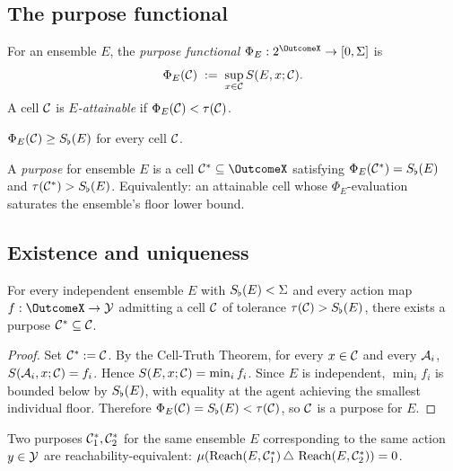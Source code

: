 \subsection{The purpose functional}

\begin{definition}\label{def:purp-func}
For an ensemble $E$, the \emph{purpose functional}
$\Phi_E:2^{\OutcomeX}\to[0,\Sigma]$ is
\[
\Phi_E(\mathcal{C})\;:=\;\sup_{x\in\mathcal{C}} S(E,x;\mathcal{C}).
\]
A cell $\mathcal{C}$ is \emph{$E$-attainable} if $\Phi_E(\mathcal{C})<\tau(\mathcal{C})$.
\end{definition}

\begin{proposition}\label{prop:phi-lb}
$\Phi_E(\mathcal{C})\ge S_{\flat}(E)$ for every cell $\mathcal{C}$.
\end{proposition}

\begin{definition}[Purpose]\label{def:purpose}
A \emph{purpose} for ensemble $E$ is a cell $\Cell^*\subseteq\OutcomeX$
satisfying $\Phi_E(\mathcal{C}^*)=S_{\flat}(E)$ and $\tau(\mathcal{C}^*)>S_{\flat}(E)$.
Equivalently: an attainable cell whose $\Phi_E$-evaluation saturates the
ensemble's floor lower bound.
\end{definition}

\subsection{Existence and uniqueness}

\begin{theorem}\label{thm:purp-exist}
For every independent ensemble $E$ with $S_{\flat}(E)<\Sigma$ and every
action map $\ActionMap:\OutcomeX\to\ActionSp$ admitting a cell $\mathcal{C}$ of
tolerance $\tau(\mathcal{C})>S_{\flat}(E)$, there exists a purpose
$\mathcal{C}^*\subseteq\mathcal{C}$.
\end{theorem}

\begin{proof}
Set $\mathcal{C}^*:=\mathcal{C}$. By the Cell-Truth Theorem, for every $x\in\mathcal{C}$ and
every $\mathcal{A}_i$, $S(\mathcal{A}_i,x;\mathcal{C})=f_i$. Hence
$S(E,x;\mathcal{C})=\min_if_i$. Since $E$ is independent, $\min_if_i$ is bounded
below by $S_{\flat}(E)$, with equality at the agent achieving the smallest
individual floor. Therefore $\Phi_E(\mathcal{C})=S_{\flat}(E)<\tau(\mathcal{C})$, so
$\mathcal{C}$ is a purpose for $E$.
\end{proof}

\begin{theorem}
\label{thm:purp-unique}
Two purposes $\mathcal{C}^*_1,\mathcal{C}^*_2$ for the same ensemble $E$ corresponding
to the same action $y\in\mathcal{Y}$ are reachability-equivalent:
$\mu(\operatorname{Reach}(E,\mathcal{C}^*_1)\,\triangle\,\operatorname{Reach}(E,\mathcal{C}^*_2))=0$.
\end{theorem}

